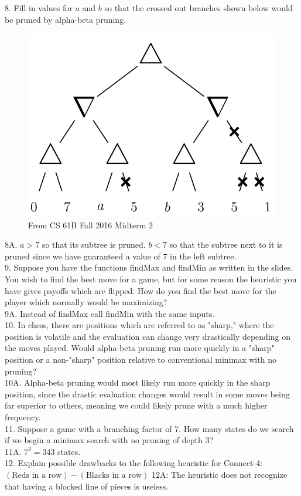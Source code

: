 \documentclass[12pt, letterpaper]{article}
\begin{document}
8. Fill in values for $a$ and $b$ so that the crossed out branches shown below would be pruned by alpha-beta pruning.
\begin{figure}[H]
    \centering
    \includegraphics[scale=0.3]{alpha-beta-prob.png}
    \caption*{From CS 61B Fall 2016 Midterm 2}
\end{figure}
8A. $a > 7$ so that its subtree is pruned. $b < 7$ so that the subtree next to it is pruned since we have guaranteed a value of $7$ in the left subtree. \\ 


9. Suppose you have the functions findMax and findMin as written in the slides. You wish to find the best move for a game, but for some reason the heuristic you have gives payoffs which are flipped. How do you find the best move for the player which normally would be maximizing? \\
9A. Instead of findMax call findMin with the same inputs. \\

10. In chess, there are positions which are referred to as "sharp," where the position is volatile and the evaluation can change very drastically depending on the moves played. Would alpha-beta pruning run more quickly in a "sharp" position or a non-"sharp" position relative to conventional minimax with no pruning? \\
10A. Alpha-beta pruning would most likely run more quickly in the sharp position, since the drastic evaluation changes would result in some moves being far superior to others, meaning we could likely prune with a much higher frequency. \\

11. Suppose a game with a branching factor of 7. How many states do we search if we begin a minimax search with no pruning of depth 3? \\
11A. $7^3 = 343$ states. \\

12. Explain possible drawbacks to the following heuristic for Connect-4: $(\text{Reds in a row}) - (\text{Blacks in a row})$
12A: The heuristic does not recognize that having a blocked line of pieces is useless.
\end{document}
